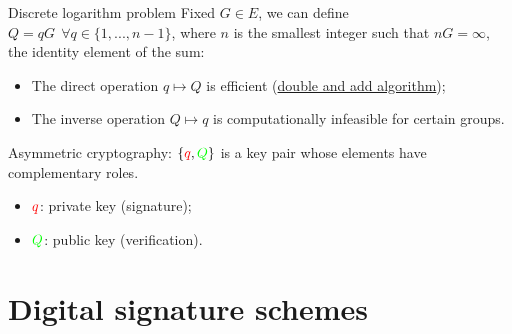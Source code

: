 \documentclass[slidescentered]{beamer}
\begin{document}
    
    \begin{frame}{Discrete logarithm problem}
    	Fixed $G \in E$, we can define $Q = qG \ \ \forall q \in \{1, ..., n - 1\}$,  where $n$ is the smallest integer such that $nG = \infty$, the identity element of the sum:
    	\begin{itemize}
    		\item The direct operation $q \mapsto Q$ is efficient (\hyperlink{double_add}{double and add algorithm});
    		\item The inverse operation $Q \mapsto q$ is computationally infeasible for certain groups.
    	\end{itemize}
    	
    	\bigskip
    	\noindent
    	Asymmetric cryptography: $\{\textcolor{red}{q}, \textcolor{green}{Q}\}$ is a key pair whose elements have complementary roles.
    	\begin{itemize}
    		\item $\textcolor{red}{q}$: private key (signature);
    		\item $\textcolor{green}{Q}$: public key (verification).
    	\end{itemize}
	\end{frame}
    
    \section{Digital signature schemes}
    
\end{document}
